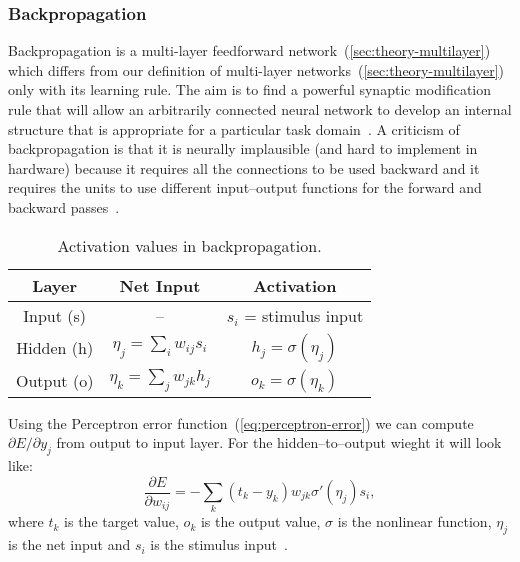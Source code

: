 \subsubsection{Backpropagation}
\label{sec:models-bp} 

Backpropagation is a multi-layer feedforward network~(\ref{sec:theory-multilayer}) which differs from our definition of multi-layer networks~(\ref{sec:theory-multilayer}) only with its learning rule. The aim is to find a powerful synaptic modification rule that will allow an arbitrarily connected neural network to develop an internal structure that is appropriate for a particular task domain~\citep{rumelhart1986learning}. A criticism of backpropagation is that it is neurally implausible (and hard to implement in hardware) because it requires all the connections to be used backward and it requires the units to use different input--output functions for the forward and backward passes~\citep{hinton1988learning}.

\begin{table}[H] 
  \centering
  \begin{tabular}{|ccc|}
    \hline
    Layer & Net Input & Activation\\
    \hline
    Input (s)  & -- & $s_i$ = stimulus input\\
    \hline
    Hidden (h) & \hspace{0.3cm} $\eta_j = \sum_i w_{ij}s_i$ \hspace{0.3cm} &
    $h_j = \sigma(\eta_j)$\hspace{0.3cm}\\
    \hline
    Output (o) & \hspace{0.3cm} $\eta_k = \sum_j w_{jk}h_j$ \hspace{0.3cm} & 
    $o_k = \sigma(\eta_k)$\hspace{0.3cm}\\
    \hline
  \end{tabular}
  \caption{Activation values in backpropagation.}
  \label{tab:models-bp}
\end{table}

Using the Perceptron error function~(\ref{eq:perceptron-error}) we can compute $\partial E / \partial y_j$ from output to input layer. For the hidden--to--output wieght it will look like: 
\begin{equation} 
\frac{\partial E}{\partial w_{ij}} = -\sum_k(t_k-y_k)w_{jk}\sigma'(\eta_j)s_i,
\end{equation}
where $t_k$ is the target value, $o_k$ is the output value, $\sigma$ is the nonlinear function, $\eta_j$ is the net input and $s_i$ is the stimulus input~\citep{o1996bio}.

